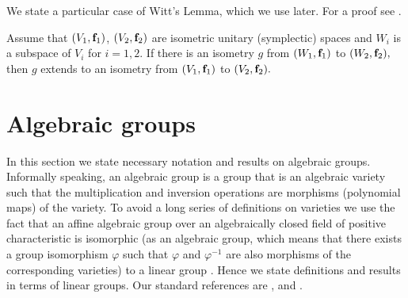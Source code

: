 We state  a particular case of Witt's Lemma, which we use later. For a proof see \cite[\S 20]{asch}.

\begin{Lem}
\label{witt}
 Assume that $(V_1,{\bf f}_1)$, $(V_2,{\bf f}_2)$ are isometric unitary (symplectic) spaces and  $W_i$ is a subspace of $V_i$ for $i=1,2.$ If there is an isometry $g$ from $(W_1,{\bf f}_1)$ to $(W_2,{\bf f}_2),$ then $g$ extends to an isometry from $(V_1,{\bf f}_1)$ to $(V_2,{\bf f}_2).$  
\end{Lem}


\section{Algebraic groups}
\label{algsec}
 In this section we state necessary notation and results on algebraic groups.  
Informally speaking, an algebraic group is a group that is an algebraic variety such that  the multiplication and inversion operations are morphisms (polynomial maps) of the variety. To avoid a long series of definitions on varieties we use the fact that an affine algebraic group over an algebraically closed field of positive characteristic is isomorphic (as an algebraic group, which means that there exists a group isomorphism $\varphi$ such that $\varphi$ and $\varphi^{-1}$ are also  morphisms of the corresponding varieties) to a linear group \cite[p. 63]{hump}. Hence we state definitions and results in terms of linear groups.  Our standard references are \cite[Chapter 1]{carter}, \cite[Chapter 1]{gorlyo} and \cite{hump}.


